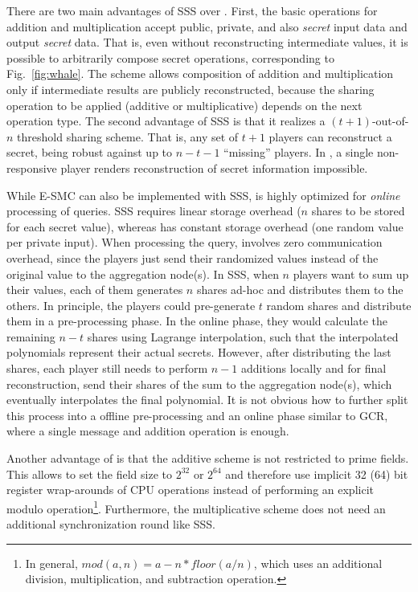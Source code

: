 \documentclass{sig-alternate}
\begin{document}
There are two main advantages of SSS over \ata. First, the basic operations for addition and multiplication accept public, private, and 
also \emph{secret} input data and output \emph{secret} data. That is, even without reconstructing intermediate values, it is possible to arbitrarily compose secret operations, corresponding to Fig.~\ref{fig:whale}. The \ata scheme allows composition of addition and multiplication only if intermediate results are publicly reconstructed, because the sharing operation to be applied (additive or multiplicative) depends on the next operation type. The second advantage of SSS is that it realizes a $(t+1)$-out-of-$n$ threshold sharing scheme. That is, any set of $t+1$ players can reconstruct a secret, being robust against up to $n-t-1$ ``missing'' players. In \ata, a single non-responsive player renders reconstruction of secret information impossible. 

While E-SMC can also be implemented with SSS, \ata is highly optimized for \emph{online} processing of queries. SSS
requires linear storage overhead ($n$ shares to be stored for each secret value), whereas \ata has constant storage overhead (one random value per private input). When processing the query, \ata involves zero communication overhead, since the players just send their randomized values instead of the original value to the aggregation node(s). 
In SSS, when $n$ players want to sum up their values, each of them generates $n$ shares ad-hoc and distributes them to the others. 
In principle, the players could pre-generate $t$ random shares and distribute them in a pre-processing phase. In the online phase, they would calculate the remaining $n-t$ shares using Lagrange interpolation, such that the interpolated polynomials represent their actual secrets. However, after distributing the last shares, each player still needs to perform $n-1$ additions locally and for final reconstruction, send their shares of the sum to the aggregation node(s), which eventually interpolates the final polynomial. 
It is not obvious how to further split this process into a offline pre-processing and an online phase similar to GCR, where a single message and addition operation is enough.

Another advantage of \ata is that the additive scheme is not restricted to prime fields. This allows to set the field size to $2^{32}$ or $2^{64}$ and therefore use implicit 32 (64) bit register wrap-arounds of CPU operations instead of performing an explicit modulo operation\footnote{In general, $mod(a, n) = a - n * floor(a / n)$, which uses an additional division, multiplication, and subtraction operation.}. 
Furthermore, the multiplicative \ata scheme does not need an additional synchronization round like SSS.  
\end{document}
